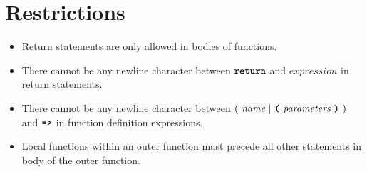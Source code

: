 \section*{Restrictions}

\begin{itemize}
\item Return statements are only allowed in bodies of functions.
\item There cannot be any newline character between
$\textbf{\texttt{return}}$ and $\textit{expression}$ in return statements.
\item There cannot be any newline character between
  $(\ \textit{name}\ | \ \textbf{\texttt{(}}\ \textit{parameters}\ \textbf{\texttt{)}}\ )$
                                               and
$\texttt{\textbf{=>}}$ in function definition expressions.
\item Local functions within an outer function
  must precede all other statements in body of the outer function.
\end{itemize}

